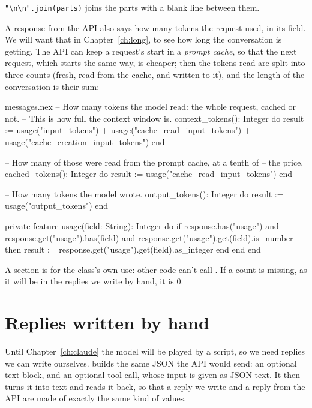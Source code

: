 \texttt{"\textbackslash n\textbackslash n".join(parts)} joins the parts with
a blank line between them.

A response from the API also says how many tokens the request used, in its
 field. We will want that in Chapter~\ref{ch:long}, to see how
long the conversation is getting. The API can keep a request's start in a
\emph{prompt cache}, so that the next request, which starts the same way,
is cheaper; then the tokens read are split into three counts (fresh, read
from the cache, and written to it), and the length of the conversation is
their sum:

\begin{continued}{messages.nex}
  -- How many tokens the model read: the whole request, cached or not.
  -- This is how full the context window is.
  context_tokens(): Integer do
    result := usage("input_tokens") + usage("cache_read_input_tokens")
      + usage("cache_creation_input_tokens")
  end

  -- How many of those were read from the prompt cache, at a tenth of
  -- the price.
  cached_tokens(): Integer do
    result := usage("cache_read_input_tokens")
  end

  -- How many tokens the model wrote.
  output_tokens(): Integer do
    result := usage("output_tokens")
  end

  private feature
    usage(field: String): Integer do
      if response.has("usage") and response.get("usage").has(field)
        and response.get("usage").get(field).is_number then
        result := response.get("usage").get(field).as_integer
      end
    end
end
\end{continued}

A  section is for the class's own use: other code
can't call . If a count is missing, as it will be in the
replies we write by hand, it is 0.

\section{Replies written by hand}

Until Chapter~\ref{ch:claude} the model will be played by a script, so we
need replies we can write ourselves.  builds the same
JSON the API would send: an optional text block, and an optional tool call,
whose input is given as JSON text. It then turns it into text and reads it
back, so that a reply we write and a reply from the API are made of exactly
the same kind of values.

